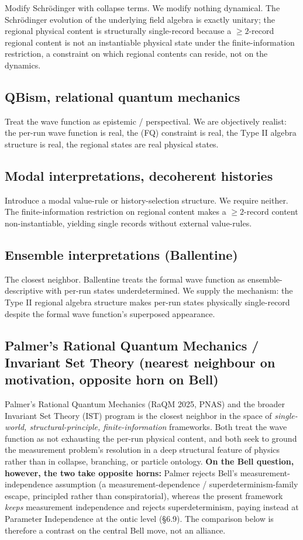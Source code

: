 \documentclass[11pt,a4paper]{article}
\begin{document}
Modify Schrödinger with collapse terms. We modify nothing dynamical. The Schrödinger evolution of the underlying field algebra is exactly unitary; the regional physical content is structurally single-record because a $\ge 2$-record regional content is not an instantiable physical state under the finite-information restriction, a constraint on which regional contents can reside, not on the dynamics.

\subsection{QBism, relational quantum mechanics}

Treat the wave function as epistemic / perspectival. We are objectively realist: the per-run wave function is real, the (FQ) constraint is real, the Type II algebra structure is real, the regional states are real physical states.

\subsection{Modal interpretations, decoherent histories}

Introduce a modal value-rule or history-selection structure. We require neither. The finite-information restriction on regional content makes a $\ge 2$-record content non-instantiable, yielding single records without external value-rules.

\subsection{Ensemble interpretations (Ballentine)}

The closest neighbor. Ballentine treats the formal wave function as ensemble-descriptive with per-run states underdetermined. We supply the mechanism: the Type II regional algebra structure makes per-run states physically single-record despite the formal wave function's superposed appearance.

\subsection{Palmer's Rational Quantum Mechanics / Invariant Set Theory (nearest neighbour on motivation, opposite horn on Bell)}

Palmer's Rational Quantum Mechanics (RaQM 2025, PNAS) and the broader Invariant Set Theory (IST) program is the closest neighbor in the space of \emph{single-world, structural-principle, finite-information} frameworks. Both treat the wave function as not exhausting the per-run physical content, and both seek to ground the measurement problem's resolution in a deep structural feature of physics rather than in collapse, branching, or particle ontology. \textbf{On the Bell question, however, the two take opposite horns:} Palmer rejects Bell's measurement-independence assumption (a measurement-dependence / superdeterminism-family escape, principled rather than conspiratorial), whereas the present framework \emph{keeps} measurement independence and rejects superdeterminism, paying instead at Parameter Independence at the ontic level (§6.9). The comparison below is therefore a contrast on the central Bell move, not an alliance.
\end{document}
